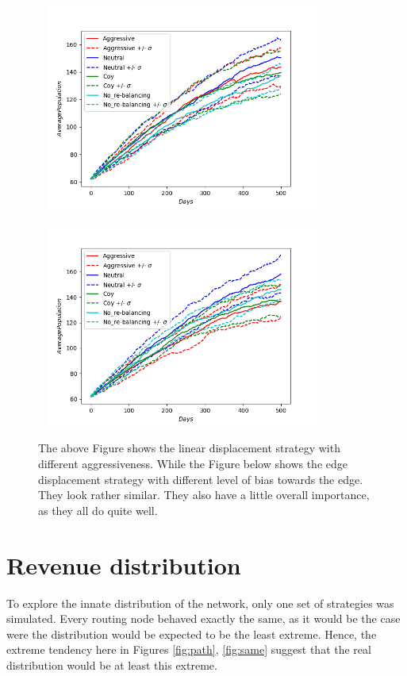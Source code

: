 \begin{figure}[!htb]
	\hspace*{-0.7cm}\
	\centering
	\includegraphics[width=9cm]{images/histories_linear.png}
	\label{fig:funding}
	\hspace*{2mm} 
\end{figure}
\vspace*{-1cm}
\begin{figure}[!htb]
	\hspace*{-0.7cm}\
	\centering
	\includegraphics[width=9cm]{images/histories_edge.png}
	\caption{ The above Figure shows the linear displacement strategy with different aggressiveness. While the Figure below shows the edge displacement strategy with different level of bias towards the edge. They look rather similar. They also have a little overall importance, as they all do quite well.
	}
	\label{fig:funding}
	\hspace*{2mm} 
\end{figure}

\section{Revenue distribution}

To explore the innate distribution of the network, only one set of strategies was simulated. Every routing node behaved exactly the same, as it would be the case were the distribution would be expected to be the least extreme. Hence, the extreme tendency here in Figures \ref{fig:path}, \ref{fig:same} suggest that the real distribution would be at least this extreme.   

